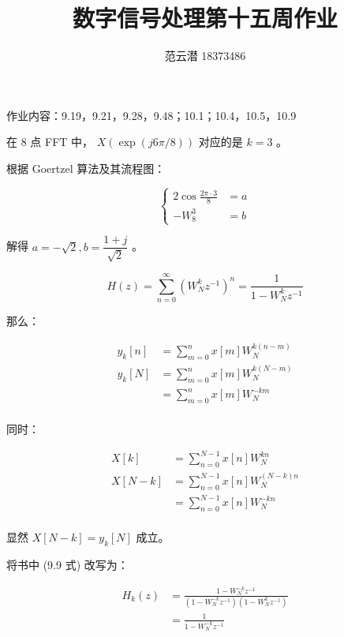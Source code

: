 \documentclass[lang=cn,11pt,a4paper,cite=authoryear, twocolumn]{elegantpaper}
\title{数字信号处理\quad 第十五周作业}
\author{范云潜 18373486}
\institute{微电子学院 184111 班}
\date{\zhtoday}
\begin{document}
\maketitle

作业内容：9.19，9.21，9.28，9.48；10.1；10.4，10.5，10.9


在 \(8\) 点 FFT 中， \(X(\exp (j 6 \pi / 8))\) 对应的是 \(k = 3\) 。

根据 Goertzel 算法及其流程图：

\[\left\{
\begin{aligned}
    2 \cos \frac{2\pi \cdot 3}{8} & = a \\ 
    -W_8^3 &= b 
\end{aligned}    
\right.\]

解得 \(a = -\sqrt{2}, b = \dfrac{1 + j}{\sqrt{2}}\) 。



\[H(z) = \sum_{n = 0} ^\infty \left(W_N^k z^{-1} \right)^n = \frac{1}{1-W_N^k z^{-1}}   \]

那么：

\[\begin{aligned}
    y_k[n] &= \sum_{m=0}^n x[m] W_N^{k(n-m)} \\ 
    y_k[N] &= \sum_{m=0}^n x[m] W_N^{k(N-m)} \\ 
    &= \sum_{m=0}^n x[m] W_N^{-km} \\ 
\end{aligned}\]

同时：

\[\begin{aligned}
    X[k] &= \sum_{n=0}^{N-1} x[n] W_N^{kn} \\ 
    X[N-k] &= \sum_{n=0}^{N-1} x[n] W_N^{(N-k)n} \\ 
    &= \sum_{n=0}^{N-1} x[n] W_N^{-kn} \\ 
\end{aligned}\]

显然 \(X[N-k] = y_k[N]\) 成立。


将书中 (9.9 式) 改写为：

\[\begin{aligned}
    H_k(z) &= \frac{1 - W_N^{-k} z^{-1}}{(1 - W_N^{-k} z^{-1}) (1 - W_{N}^{k}z^{-1})} \\ 
    &= \frac{1}{1 - W_N^{-k} z^{-1}} 
\end{aligned}\]
\end{document}
